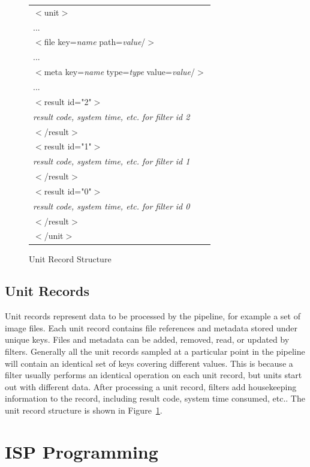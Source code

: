 \documentclass{article}
\begin{document}
\begin{figure}
\begin{center}
\begin{tabular}{|l|}\hline
$<$unit$>$\\
...\\
$<$file key={\em name} path={\em value}/$>$\\
...\\
$<$meta key={\em name} type={\em type} value={\em value}/$>$\\
...\\
$<$result id="2"$>$\\
{\em result code, system time, etc. for filter id 2}\\
$<$/result$>$\\
$<$result id="1"$>$\\
{\em result code, system time, etc. for filter id 1}\\
$<$/result$>$\\
$<$result id="0"$>$\\
{\em result code, system time, etc. for filter id 0}\\
$<$/result$>$\\
$<$/unit$>$\\
\hline
\end{tabular}
\end{center}
\caption{Unit Record Structure}\label{figunit}
\end{figure}

\subsection{Unit Records}

Unit records represent data to be processed by the pipeline, for
example a set of image files.  Each unit record contains file references 
and metadata stored under unique keys.  Files and metadata can be added, 
removed, read, or updated by filters.
Generally all the unit records sampled at a particular point in the 
pipeline will contain an identical set of keys covering different values.
This is because a filter usually performs an identical operation on 
each unit record, but units start out with different data.
After processing a unit record, filters add housekeeping information to
the record, including result code, system time consumed, etc..
The unit record structure is shown in Figure~\ref{figunit}.

\newpage
\section{ISP Programming}\label{secprog}
\end{document}
